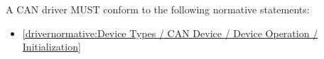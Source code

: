 \label{sec:Conformance / Driver Conformance / CAN Driver Conformance}

A CAN driver MUST conform to the following normative statements:

\begin{itemize}
\item \ref{drivernormative:Device Types / CAN Device / Device Operation / Initialization}
\end{itemize}
